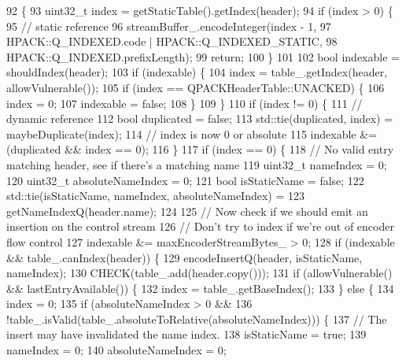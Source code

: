 \begin{DoxyCode}
92                                                                              \{
93   uint32\_t index = getStaticTable().getIndex(header);
94   \textcolor{keywordflow}{if} (index > 0) \{
95     \textcolor{comment}{// static reference}
96     streamBuffer_.encodeInteger(index - 1,
97                                 HPACK::Q_INDEXED.code | HPACK::Q_INDEXED_STATIC,
98                                 HPACK::Q_INDEXED.prefixLength);
99     \textcolor{keywordflow}{return};
100   \}
101 
102   \textcolor{keywordtype}{bool} indexable = shouldIndex(header);
103   \textcolor{keywordflow}{if} (indexable) \{
104     index = table_.getIndex(header, allowVulnerable());
105     \textcolor{keywordflow}{if} (index == QPACKHeaderTable::UNACKED) \{
106       index = 0;
107       indexable = \textcolor{keyword}{false};
108     \}
109   \}
110   \textcolor{keywordflow}{if} (index != 0) \{
111     \textcolor{comment}{// dynamic reference}
112     \textcolor{keywordtype}{bool} duplicated = \textcolor{keyword}{false};
113     std::tie(duplicated, index) = maybeDuplicate(index);
114     \textcolor{comment}{// index is now 0 or absolute}
115     indexable &= (duplicated && index == 0);
116   \}
117   \textcolor{keywordflow}{if} (index == 0) \{
118     \textcolor{comment}{// No valid entry matching header, see if there's a matching name}
119     uint32\_t nameIndex = 0;
120     uint32\_t absoluteNameIndex = 0;
121     \textcolor{keywordtype}{bool} isStaticName = \textcolor{keyword}{false};
122     std::tie(isStaticName, nameIndex, absoluteNameIndex) =
123       getNameIndexQ(header.name);
124 
125     \textcolor{comment}{// Now check if we should emit an insertion on the control stream}
126     \textcolor{comment}{// Don't try to index if we're out of encoder flow control}
127     indexable &= maxEncoderStreamBytes_ > 0;
128     \textcolor{keywordflow}{if} (indexable && table_.canIndex(header)) \{
129       encodeInsertQ(header, isStaticName, nameIndex);
130       CHECK(table_.add(header.copy()));
131       \textcolor{keywordflow}{if} (allowVulnerable() && lastEntryAvailable()) \{
132         index = table_.getBaseIndex();
133       \} \textcolor{keywordflow}{else} \{
134         index = 0;
135         \textcolor{keywordflow}{if} (absoluteNameIndex > 0 &&
136             !table_.isValid(table_.absoluteToRelative(absoluteNameIndex))) \{
137           \textcolor{comment}{// The insert may have invalidated the name index.}
138           isStaticName = \textcolor{keyword}{true};
139           nameIndex = 0;
140           absoluteNameIndex = 0;

\end{DoxyCode}
